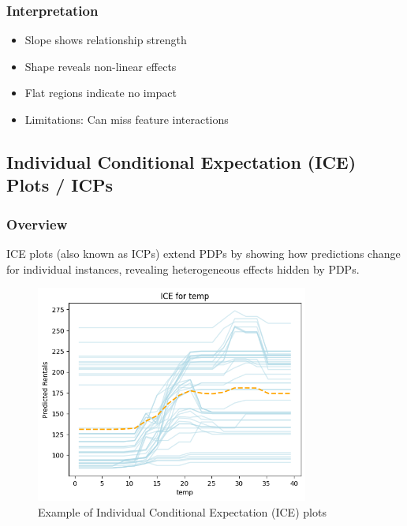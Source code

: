 \documentclass{article}
\begin{document}
\subsubsection{Interpretation}
\begin{itemize}
    \item Slope shows relationship strength
    \item Shape reveals non-linear effects
    \item Flat regions indicate no impact
    \item Limitations: Can miss feature interactions
\end{itemize}

\subsection{Individual Conditional Expectation (ICE) Plots / ICPs}

\subsubsection{Overview}
ICE plots (also known as ICPs) extend PDPs by showing how predictions change for individual instances, revealing heterogeneous effects hidden by PDPs.

\begin{figure}[h]
    \centering
    \includegraphics[width=0.8\textwidth]{images/ice.png}
    \caption{Example of Individual Conditional Expectation (ICE) plots}
    \label{fig:ice}
\end{figure}
\end{document}
